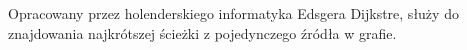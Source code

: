 \documentclass[preview]{standalone}
\begin{document}
\begin{center}
Opracowany przez holenderskiego informatyka Edsgera Dijkstre, służy do znajdowania najkrótszej ścieżki z pojedynczego źródła w grafie.
\end{center}
\end{document}
